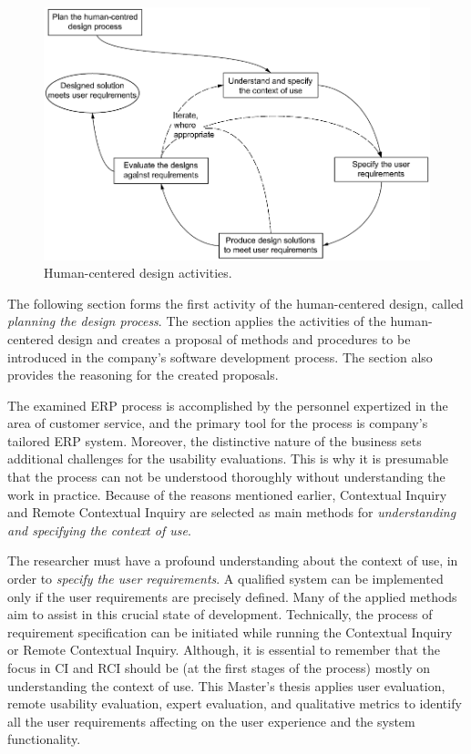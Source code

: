 \documentclass[12pt,a4paper,oneside,pdftex]{report}
\begin{document}
\begin{figure}[H]
  	\centering
    	\includegraphics[width=1.0\textwidth]{./images/hci_process.png}
  	\caption{Human-centered design activities.\citep{RefWorks:40}}
	\label{fig:hci_process}
\end{figure}



The following section forms the first activity of the human-centered design, called \emph{planning the design process}. The section applies the activities of the human-centered design and creates a proposal of methods and procedures to be introduced in the company's software development process. The section also provides the reasoning for the created proposals.

The examined ERP process is accomplished by the personnel expertized in the area of customer service, and the primary tool for the process is company's tailored ERP system. Moreover, the distinctive nature of the business sets additional challenges for the usability evaluations. This is why it is presumable that the process can not be understood thoroughly without understanding the work in practice. Because of the reasons mentioned earlier, Contextual Inquiry and Remote Contextual Inquiry are selected as main methods for \emph{understanding and specifying the context of use}.

The researcher must have a profound understanding about the context of use, in order to \emph{specify the user requirements}. A qualified system can be implemented only if the user requirements are precisely defined. Many of the applied methods aim to assist in this crucial state of development. Technically, the process of requirement specification can be initiated while running the Contextual Inquiry or Remote Contextual Inquiry. Although, it is essential to remember that the focus in CI and RCI should be (at the first stages of the process) mostly on understanding the context of use. This Master's thesis applies user evaluation, remote usability evaluation, expert evaluation, and qualitative metrics to identify all the user requirements affecting on the user experience and the system functionality.
\end{document}
